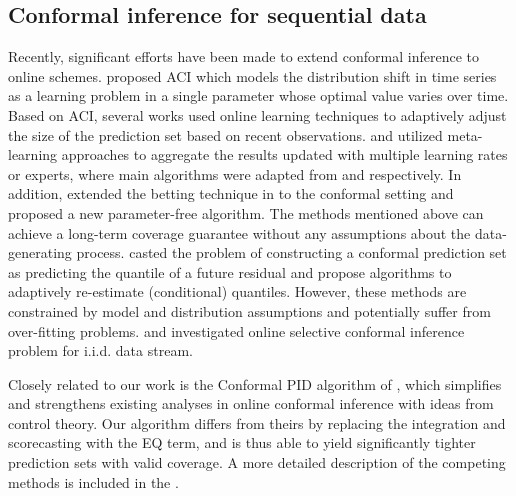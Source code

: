 
\subsection{Conformal inference for sequential data}
\vspace{-0.5em}
Recently, significant efforts have been made to extend conformal inference to online schemes. \cite{aci_gibbs2021adaptive} proposed ACI which models the distribution shift in time series as a learning problem in a single parameter whose optimal value varies over time. Based on ACI, several works \citep{gibbs2024conformal,zaffran2022adaptive,bhatnagar2023improved,podkopaevadaptive,angelopoulos2024online,yang2024bellman} used online learning techniques to adaptively adjust the size of the prediction set based on recent observations. \citet{gibbs2024conformal} and \citet{bhatnagar2023improved} utilized meta-learning approaches to aggregate the results updated with multiple learning rates or experts, where main algorithms were adapted from \citet{gradu2023adaptive} and \citet{jun2017improved} respectively. In addition, \citet{podkopaevadaptive} extended the betting technique in \citet{orabona2016coin} to the conformal setting and proposed a new parameter-free algorithm. The methods mentioned above can achieve a long-term coverage guarantee without any assumptions about the data-generating process. \citet{xu2021conformal,xu2023conformal} casted the problem of constructing a conformal prediction set as predicting the quantile of a future residual and propose algorithms to adaptively re-estimate (conditional) quantiles. However, these methods are constrained by model and distribution assumptions and potentially suffer from over-fitting problems. \citet{weinstein2020online} and \citet{bao2024cap} investigated online selective conformal inference problem for i.i.d. data stream.


Closely related to our work is the Conformal PID algorithm of \cite{pid_angelopoulos2024conformal}, which simplifies and strengthens existing analyses in online conformal inference with ideas from control theory. Our algorithm differs from theirs by replacing the integration and scorecasting with the EQ term, and is thus able to yield significantly tighter prediction sets with valid coverage. A more detailed description of the competing methods is included in the .


